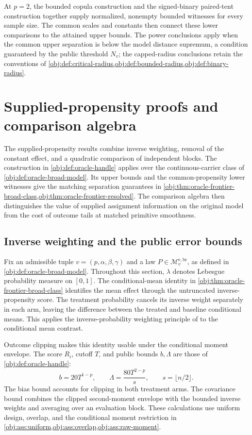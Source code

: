 \documentclass[11pt]{article}
\begin{document}
At \(p=2\), the bounded copula construction and the signed-binary paired-tent construction together supply normalized, nonempty bounded witnesses for every sample size. The common scales and constants then connect these lower comparisons to the attained upper bounds. The power conclusions apply when the common upper separation is below the model distance supremum, a condition guaranteed by the public threshold \(N_v\); the capped-radius conclusions retain the conventions of \cref{obj:def:critical-radius,obj:def:bounded-radius,obj:def:binary-radius}.


\section{Supplied-propensity proofs and comparison algebra}

The supplied-propensity results combine inverse weighting, removal of the constant effect, and a quadratic comparison of independent blocks. The construction in \cref{obj:def:oracle-handle} applies over the continuous-carrier class of \cref{obj:def:oracle-broad-model}. Its upper bounds and the common-propensity lower witnesses give the matching separation guarantees in \cref{obj:thm:oracle-frontier-broad-class,obj:thm:oracle-frontier-resolved}. The comparison algebra then distinguishes the value of supplied assignment information on the original model from the cost of outcome tails at matched primitive smoothness.

\subsection{Inverse weighting and the public error bounds}

Fix an admissible tuple \(v=(p,\alpha,\beta,\gamma)\) and a law \(P\in\mathcal M_v^{\mathrm{e,br}}\), as defined in \cref{obj:def:oracle-broad-model}. Throughout this section, \(\lambda\) denotes Lebesgue probability measure on \([0,1]\). The conditional-mean identity in \cref{obj:thm:oracle-frontier-broad-class} identifies the mean effect through the untruncated inverse-propensity score. The treatment probability cancels its inverse weight separately in each arm, leaving the difference between the treated and baseline conditional means. This applies the inverse-probability weighting principle of \citet[pp.~665--666]{Horvitz1952} to the conditional mean contrast.

Outcome clipping makes this identity usable under the conditional moment envelope. The score \(R_i\), cutoff \(T\), and public bounds \(b,\Lambda\) are those of \cref{obj:def:oracle-handle}:
\[
b=20T^{1-p},
\qquad
\Lambda=\frac{80T^{2-p}}{s},
\qquad
s=\lfloor n/2\rfloor.
\]
The bias bound accounts for clipping in both treatment arms. The covariance bound combines the clipped second-moment envelope with the bounded inverse weights and averaging over an evaluation block. These calculations use uniform design, overlap, and the conditional moment restriction in
\cref{obj:ass:uniform,obj:ass:overlap,obj:ass:raw-moment}.
\end{document}
